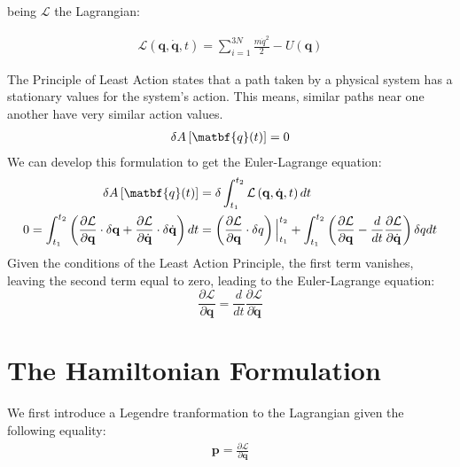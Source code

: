 \documentclass[draft]{agujournal2019}
\begin{document}
being $\mathcal{L}$ the Lagrangian:

\begin{align*}
    \mathcal{L} \left(\mathbf{q}, \dot{\mathbf{q}}, t \right) = \sum_{i = 1}^{3N} \frac{m \dot{q}^2}{2} - U(\mathbf{q})
\end{align*}

\begin{definition}
    The Principle of Least Action states that a path taken by a physical system has a stationary values for the system's action. This means, similar paths near one another have very similar action values.
    \begin{align*}
        \delta A\left[ \matbf{q}(t) \right] = 0
    \end{align*}
    We can develop this formulation to get the Euler-Lagrange equation:
    \begin{align*}
        \delta A\left[ \matbf{q}(t) \right] &= \delta \int_{t_1}^{t_2} \mathcal{L}\left(\mathbf{q}, \dot{\mathbf{q}}, t\right) dt \\
        0 = \int_{t_1}^{t_2} \left( \frac{\partial \mathcal{L}}{\partial \mathbf{q}} \cdot \delta \mathbf{q} + \frac{\partial \mathcal{L}}{\partial \dot{\mathbf{q}}} \cdot \delta \dot{\mathbf{q}} \right)dt &= \left( \frac{\partial \mathcal{L}}{\partial \mathbf{q}} \cdot \delta q \right) \Big|_{t_1}^{t_2} + \int_{t_1}^{t_2} \left( \frac{\partial \mathcal{L}}{\partial \mathbf{q}} - \frac{d}{dt} \frac{\partial \mathcal{L}}{\partial \dot{\mathbf{q}}}  \right) \delta q dt
    \end{align*}
    Given the conditions of the Least Action Principle, the first term vanishes, leaving the second term equal to zero, leading to the Euler-Lagrange equation:
    \begin{equation}
        \frac{\partial \mathcal{L}}{\partial \mathbf{q}} = \frac{d}{dt} \frac{\partial \mathcal{L}}{\partial \dot{\mathbf{q}}}
    \end{equation}
\end{definition}

\section{The Hamiltonian Formulation}
We first introduce a Legendre tranformation to the Lagrangian given the following equality:
\begin{align*}
    \mathbf{p} = \frac{\partial \mathcal{L}}{\partial \mathbf{q}}
\end{align*}
\end{document}
